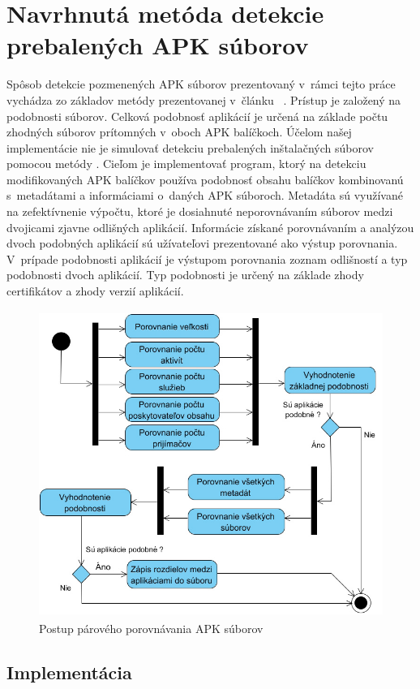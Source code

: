\section{Navrhnutá metóda detekcie prebalených APK súborov}
Spôsob detekcie pozmenených APK súborov prezentovaný v~rámci tejto práce vychádza zo základov metódy prezentovanej v~článku ~\cite{Zhauniarovich2014}. Prístup je založený na podobnosti súborov. Celková podobnosť aplikácií je určená na základe počtu zhodných súborov prítomných v~oboch APK balíčkoch. Účelom našej implementácie nie je simulovať detekciu prebalených inštalačných súborov pomocou metódy . Cieľom je implementovať program, ktorý na detekciu modifikovaných APK balíčkov používa podobnosť obsahu balíčkov kombinovanú s~metadátami a informáciami o~daných APK súboroch. Metadáta sú využívané na zefektívnenie výpočtu, ktoré je dosiahnuté neporovnávaním súborov medzi dvojicami zjavne odlišných aplikácií. Informácie získané porovnávaním a analýzou dvoch podobných aplikácií sú užívateľovi prezentované ako výstup porovnania. V~prípade podobnosti aplikácií je výstupom porovnania zoznam odlišností a typ podobnosti dvoch aplikácií. Typ podobnosti je určený na základe zhody certifikátov a zhody verzií aplikácií. 
\begin{figure}[htb]
  \begin{center}
    \includegraphics[height=10cm]{images/diagram.jpg}
  \end{center}
  \caption{Postup párového porovnávania APK súborov}
  \label{fig:compareFlow}
\end{figure}
\subsection{Implementácia}

